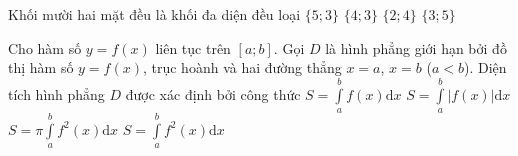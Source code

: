 \begin{ex}%
	Khối mười hai mặt đều là khối đa diện đều loại
	\choice
	{\True $ \{5;3\} $}
	{$ \{4;3\} $}
	{$ \{2;4\} $}
	{$ \{3;5\} $}
\end{ex}
\begin{ex}%
	Cho hàm số $ y=f(x) $ liên tục trên $ [a;b] $. Gọi $ D $ là hình phẳng giới hạn bởi đồ thị hàm số $ y=f(x) $, trục hoành và hai đường thẳng $ x=a $, $ x=b $ ($ a<b $). Diện tích hình phẳng $ D $ được xác định bởi công thức
	\choice
	{$ S=\displaystyle\int\limits_{a}^{b}f(x) \mathrm{d}x $}
	{\True $ S=\displaystyle\int\limits_{a}^{b}\left|f(x) \right|\mathrm{d}x $}
	{$ S=\pi\displaystyle\int\limits_{a}^{b}f^{2}(x) \mathrm{d}x $}
	{$ S=\displaystyle\int\limits_{a}^{b}f^{2}(x) \mathrm{d}x $}
\end{ex}
